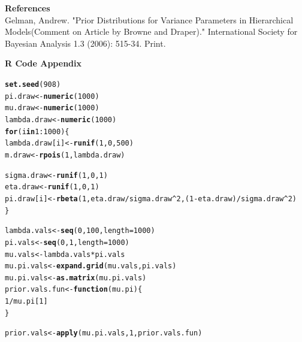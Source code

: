 \documentclass[12pt]{article}\usepackage[]{graphicx}\usepackage[]{color}
\makeatletter
\newcommand{\hlnum}[1]{\textcolor[rgb]{0.686,0.059,0.569}{#1}}%
\newcommand{\hlopt}[1]{\textcolor[rgb]{0,0,0}{#1}}%
\newcommand{\hlstd}[1]{\textcolor[rgb]{0.345,0.345,0.345}{#1}}%
\newcommand{\hlkwa}[1]{\textcolor[rgb]{0.161,0.373,0.58}{\textbf{#1}}}%
\newcommand{\hlkwb}[1]{\textcolor[rgb]{0.69,0.353,0.396}{#1}}%
\newcommand{\hlkwc}[1]{\textcolor[rgb]{0.333,0.667,0.333}{#1}}%
\newcommand{\hlkwd}[1]{\textcolor[rgb]{0.737,0.353,0.396}{\textbf{#1}}}%
\newenvironment{kframe}{%
 \def\at@end@of@kframe{}%
 \ifinner\ifhmode%
  \def\at@end@of@kframe{\end{minipage}}%
  \begin{minipage}{\columnwidth}%
 \fi\fi%
 \def\FrameCommand##1{\hskip\@totalleftmargin \hskip-\fboxsep
 \colorbox{shadecolor}{##1}\hskip-\fboxsep
     \hskip-\linewidth \hskip-\@totalleftmargin \hskip\columnwidth}%
 \MakeFramed {\advance\hsize-\width
   \@totalleftmargin\z@ \linewidth\hsize
   \@setminipage}}%
 {\par\unskip\endMakeFramed%
 \at@end@of@kframe}
\newenvironment{knitrout}{}{} %
\makeatother
\begin{document}
\newpage

{\Large \bf References} \\

\noindent Gelman, Andrew. "Prior Distributions for Variance Parameters in Hierarchical Models(Comment on Article by Browne and Draper)." International Society for Bayesian Analysis 1.3 (2006): 515-34. Print.

{\Large \bf R Code Appendix}

\begin{knitrout}\footnotesize
{}\color{fgcolor}\begin{kframe}
\begin{alltt}
\hlkwd{set.seed}\hlstd{(}\hlnum{908}\hlstd{)}
\hlstd{pi.draw} \hlkwb{<-} \hlkwd{numeric}\hlstd{(}\hlnum{1000}\hlstd{)}
\hlstd{mu.draw} \hlkwb{<-} \hlkwd{numeric}\hlstd{(}\hlnum{1000}\hlstd{)}
\hlstd{lambda.draw} \hlkwb{<-} \hlkwd{numeric}\hlstd{(}\hlnum{1000}\hlstd{)}
\hlkwa{for}\hlstd{(i} \hlkwa{in} \hlnum{1}\hlopt{:}\hlnum{1000}\hlstd{)\{}
  \hlstd{lambda.draw[i]} \hlkwb{<-} \hlkwd{runif}\hlstd{(}\hlnum{1}\hlstd{,} \hlnum{0}\hlstd{,} \hlnum{500}\hlstd{)}
  \hlstd{m.draw} \hlkwb{<-} \hlkwd{rpois}\hlstd{(}\hlnum{1}\hlstd{, lambda.draw)}

  \hlstd{sigma.draw} \hlkwb{<-} \hlkwd{runif}\hlstd{(}\hlnum{1}\hlstd{,} \hlnum{0}\hlstd{,} \hlnum{1}\hlstd{)}
  \hlstd{eta.draw} \hlkwb{<-} \hlkwd{runif}\hlstd{(}\hlnum{1}\hlstd{,} \hlnum{0}\hlstd{,} \hlnum{1}\hlstd{)}
  \hlstd{pi.draw[i]} \hlkwb{<-} \hlkwd{rbeta}\hlstd{(}\hlnum{1}\hlstd{, eta.draw}\hlopt{/}\hlstd{sigma.draw}\hlopt{^}\hlnum{2}\hlstd{, (}\hlnum{1}\hlopt{-}\hlstd{eta.draw)}\hlopt{/}\hlstd{sigma.draw}\hlopt{^}\hlnum{2}\hlstd{)}
\hlstd{\}}

\hlstd{lambda.vals} \hlkwb{<-} \hlkwd{seq}\hlstd{(}\hlnum{0}\hlstd{,} \hlnum{100}\hlstd{,} \hlkwc{length}\hlstd{=}\hlnum{1000}\hlstd{)}
\hlstd{pi.vals} \hlkwb{<-} \hlkwd{seq}\hlstd{(}\hlnum{0}\hlstd{,} \hlnum{1}\hlstd{,} \hlkwc{length}\hlstd{=}\hlnum{1000}\hlstd{)}
\hlstd{mu.vals} \hlkwb{<-} \hlstd{lambda.vals}\hlopt{*}\hlstd{pi.vals}
\hlstd{mu.pi.vals} \hlkwb{<-} \hlkwd{expand.grid}\hlstd{(mu.vals, pi.vals)}
\hlstd{mu.pi.vals} \hlkwb{<-} \hlkwd{as.matrix}\hlstd{(mu.pi.vals)}
\hlstd{prior.vals.fun} \hlkwb{<-} \hlkwa{function}\hlstd{(}\hlkwc{mu.pi}\hlstd{)\{}
  \hlnum{1}\hlopt{/}\hlstd{mu.pi[}\hlnum{1}\hlstd{]}
\hlstd{\}}

\hlstd{prior.vals} \hlkwb{<-} \hlkwd{apply}\hlstd{(mu.pi.vals,} \hlnum{1}\hlstd{, prior.vals.fun)}


\end{alltt}
\end{kframe}
\end{knitrout}
\end{document}
